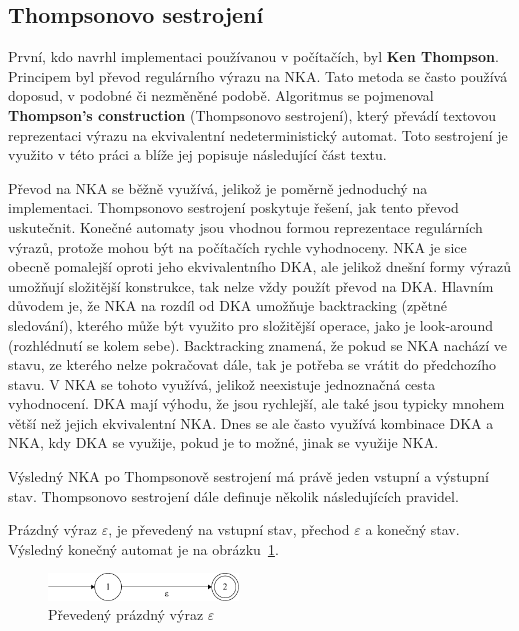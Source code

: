\subsection*{Thompsonovo sestrojení}

První, kdo navrhl implementaci používanou v počítačích, byl \textbf{Ken Thompson}\cite{ScanToPDF}.
Principem byl převod regulárního výrazu na NKA.
Tato metoda se často používá doposud, v podobné či nezměněné podobě.
Algoritmus se pojmenoval \textbf{Thompson's construction} (Thompsonovo sestrojení), který převádí textovou reprezentaci výrazu na ekvivalentní nedeterministický automat.
Toto sestrojení je využito v této práci a blíže jej popisuje následující část textu.

Převod na NKA se běžně využívá, jelikož je poměrně jednoduchý na implementaci.
Thompsonovo sestrojení poskytuje řešení, jak tento převod uskutečnit.
Konečné automaty jsou vhodnou formou reprezentace regulárních výrazů, protože mohou být na počítačích rychle vyhodnoceny.
NKA je sice obecně pomalejší oproti jeho ekvivalentního DKA, ale jelikož dnešní formy výrazů umožňují složitější konstrukce, tak nelze vždy použít převod na DKA.
Hlavním důvodem je, že NKA na rozdíl od DKA umožňuje backtracking (zpětné sledování), kterého může být využito pro složitější operace, jako je look-around (rozhlédnutí se kolem sebe).
Backtracking znamená, že pokud se NKA nachází ve stavu, ze kterého nelze pokračovat dále, tak je potřeba se vrátit do předchozího stavu.
V NKA se tohoto využívá, jelikož neexistuje jednoznačná cesta vyhodnocení.
DKA mají výhodu, že jsou rychlejší, ale také jsou typicky mnohem větší než jejich ekvivalentní NKA.
Dnes se ale často využívá kombinace DKA a NKA, kdy DKA se využije, pokud je to možné, jinak se využije NKA.

Výsledný NKA po Thompsonově sestrojení má právě jeden vstupní a výstupní stav. 
Thompsonovo sestrojení dále definuje několik následujících pravidel.

Prázdný výraz \textit{$\varepsilon$}, je převedený na vstupní stav, přechod \textit{$\varepsilon$} a konečný stav.
Výsledný konečný automat je na obrázku~\ref{fig:NFAepsilon}.
\begin{figure}[!h]
	\centering
	\includegraphics[width=0.45\textwidth]{Figures/NFA_epsilon.pdf}
	\caption{Převedený prázdný výraz $\varepsilon$}
	\label{fig:NFAepsilon}
\end{figure}

